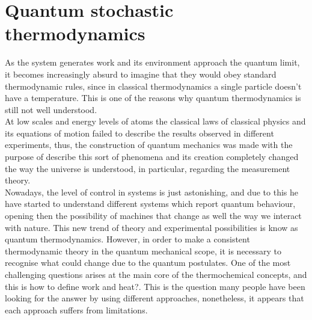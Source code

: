 \section{Quantum stochastic thermodynamics}
As the system generates work and its environment approach the quantum limit, it becomes increasingly absurd to imagine that they would obey standard thermodynamic rules, since in classical thermodynamics a single particle doesn't have a temperature.
This is one of the reasons why quantum thermodynamics is still not well understood.\\
 At low scales and energy levels of atoms the classical laws of classical physics and its equations of motion failed to describe the results observed in different experiments, thus, the construction of quantum mechanics was made with the purpose of describe this sort of phenomena and its creation completely  changed the way the universe is understood, in particular, regarding the measurement theory\cite{Wiseman}.
\\
Nowadays, the level of control in systems is just astonishing, and due to this he have started to understand different systems which report quantum behaviour, opening then the possibility of machines that change as well the way we interact with nature\cite{0953-8984-18-21-S12,cite-key2}. This new trend of theory and experimental possibilities is know as quantum thermodynamics. However, in order to make a consistent  thermodynamic theory in the quantum mechanical scope, it is necessary to recognise what could change due to the quantum postulates. One of the most challenging questions arises at the main core of the thermochemical  concepts, and this is how to define work and heat?. This is the question  many people have been looking for the answer by using different approaches, nonetheless, it appears that each approach suffers from limitations.
